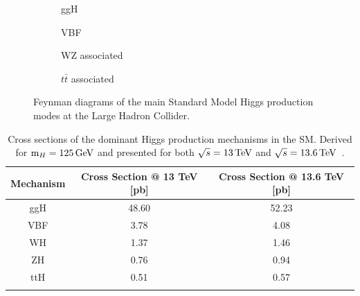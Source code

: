 \begin{figure}[!htbp]
    \centering
    \begin{subfigure}{0.45\textwidth}
        \centering
        
        \caption{ggH}
    \end{subfigure}
    \hfill
    \begin{subfigure}{0.45\textwidth}
        \centering
        
        \caption{VBF}
    \end{subfigure}

    \vspace{0.5cm}

    \begin{subfigure}{0.45\textwidth}
        \centering
        \raisebox{-5mm}{}
        \caption{WZ associated}
    \end{subfigure}
    \hfill
    \begin{subfigure}{0.45\textwidth}
        \centering
        
        \caption{$t\bar{t}$ associated}
    \end{subfigure}

    \caption{Feynman diagrams of the main Standard Model Higgs production modes at the Large Hadron Collider.}
    \label{Figure:Introduction_HiggsProductionModes}
\end{figure}


\begin{table}[!htbp]
\centering
\renewcommand{\arraystretch}{1.5} %
\begin{tabular}{|c|c|c|}
\hline
Mechanism & Cross Section @ 13 TeV [pb] & Cross Section @ 13.6 TeV [pb] \\ \hline \hline 
ggH                                & 48.60  & 52.23 \\ 
\arrayrulecolor{lightgray} \hline
VBF                                & 3.78  & 4.08 \\ 
\arrayrulecolor{lightgray} \hline
WH                                 & 1.37  & 1.46 \\ 
\arrayrulecolor{lightgray} \hline
ZH                                 & 0.76  & 0.94 \\ 
\arrayrulecolor{lightgray} \hline
ttH                                & 0.51  & 0.57 \\ 
\arrayrulecolor{black} \hline
\end{tabular}
\caption[Cross sections of dominant Standard Model Higgs production modes at $13$ and $13.6\TeV$]{Cross sections of the dominant Higgs production mechanisms in the \ac{SM}. Derived for $\text{m}_H = 125\,\text{Ge\hspace{-.08em}V}$ and presented for both $\sqrt{s}=13\,\text{Te\hspace{-.08em}V}$ and $\sqrt{s}=13.6\,\text{Te\hspace{-.08em}V}$~\cite{HiggsProduction_XS_13TeV,HiggsProduction_XS_13p6TeV}.}
\label{Table:Introduction_HiggsProduction_XS}
\end{table}

